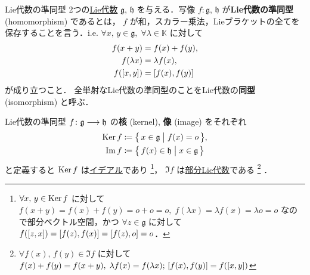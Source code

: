 \documentclass[rep_main]{subfiles}
\begin{document}
\begin{mydef}[label=def:hom-LieAlg]{Lie代数の準同型}
    2つの\hyperref[ax:LieAlg]{Lie代数} $\mathfrak{g},\, \mathfrak{h}$ を与える．写像 $f \colon \mathfrak{g},\, \mathfrak{h}$ が\textbf{Lie代数の準同型} (homomorphism) であるとは，
    $f$ が和，スカラー乗法，Lieブラケットの全てを保存することを言う．i.e. $\forall x,\, y \in \mathfrak{g},\; \forall \lambda \in \mathbb{K}$ に対して
    \begin{align}
        f (x + y) &= f(x) + f(y), \\
        f (\lambda x) &= \lambda f(x), \\
        f (\comm{x}{y}) &= \comm{f(x)}{f(y)}
    \end{align}
    が成り立つこと．
    \tcblower
    全単射なLie代数の準同型のことをLie代数の\textbf{同型} (isomorphism) と呼ぶ．
\end{mydef}

Lie代数の準同型 $f \colon \mathfrak{g} \longrightarrow \mathfrak{h}$ の\textbf{核} (kernel), \textbf{像} (image) をそれぞれ
\begin{align}
    \operatorname{Ker} f &\coloneqq \bigl\{\, x \in \mathfrak{g} \bigm| f(x) = o \,\bigr\}, \\
    \Im f &\coloneqq \bigl\{\, f(x) \in \mathfrak{h} \bigm| x \in \mathfrak{g} \,\bigr\}
\end{align}
と定義すると $\operatorname{Ker} f$ は\hyperref[def:ideal-LieAlg]{イデアル}であり
\footnote{
    $\forall x,\, y \in \operatorname{Ker} f$ に対して $f(x + y) = f(x) + f(y) = o + o = o,\; f(\lambda x) = \lambda f(x) = \lambda o = o$ なので部分ベクトル空間，かつ $\forall z \in \mathfrak{g}$ に対して $f(\comm{z}{x}) = \comm{f(z)}{f(x)} = \comm{f(z)}{o} = o$．
}，
$\Im f$ は\hyperref[def:subLieAlg]{部分Lie代数}である
\footnote{
    $\forall f(x),\, f(y) \in \Im f$ に対して $f(x) + f(y) = f(x+y),\; \lambda f(x) = f(\lambda x);\, \comm{f(x)}{f(y)} = f(\comm{x}{y})$
}
．
\end{document}
